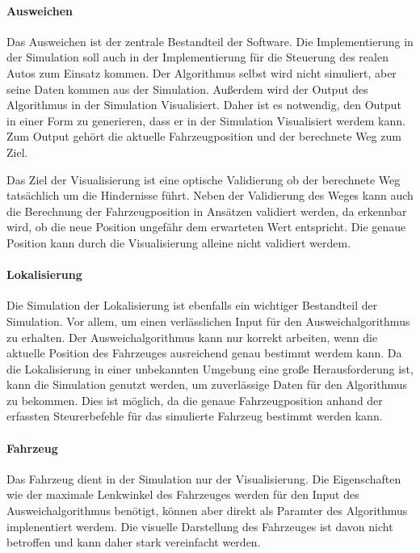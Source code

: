\paragraph{Ausweichen}
Das Ausweichen ist der zentrale Bestandteil der Software.
Die Implementierung in der Simulation soll auch in der Implementierung für die Steuerung des realen Autos zum Einsatz kommen.
Der Algorithmus selbst wird nicht simuliert, aber seine Daten kommen aus der Simulation. 
Außerdem wird der Output des Algorithmus in der Simulation Visualisiert. 
Daher ist es notwendig, den Output in einer Form zu generieren, dass er in der Simulation Visualisiert werdem kann.
Zum Output gehört die aktuelle Fahrzeugposition und der berechnete Weg zum Ziel.

Das Ziel der Visualisierung ist eine optische Validierung ob der berechnete Weg tatsächlich um die Hindernisse führt. 
Neben der Validierung des Weges kann auch die Berechnung der Fahrzeugposition in Ansätzen validiert werden, da erkennbar wird,
ob die neue Position ungefähr dem erwarteten Wert entspricht. Die genaue Position kann durch die Visualisierung alleine nicht validiert werdem.


\paragraph{Lokalisierung}
Die Simulation der Lokalisierung ist ebenfalls ein wichtiger Bestandteil der Simulation.
Vor allem, um einen verlässlichen Input für den Ausweichalgorithmus zu erhalten. 
Der Ausweichalgorithmus kann nur korrekt arbeiten, wenn die aktuelle Position des Fahrzeuges ausreichend genau bestimmt werdem kann.
Da die Lokalisierung in einer unbekannten Umgebung eine große Herausforderung ist, 
kann die Simulation genutzt werden, um zuverlässige Daten für den Algorithmus zu bekommen. 
Dies ist möglich, da die genaue Fahrzeugposition anhand der erfassten Steurerbefehle für das simulierte Fahrzeug bestimmt werden kann. 

\paragraph{Fahrzeug}
Das Fahrzeug dient in der Simulation nur der Visualisierung. 
Die Eigenschaften wie der maximale Lenkwinkel des Fahrzeuges werden für den Input des Ausweichalgorithmus benötigt, 
können aber direkt als Paramter des Algorithmus implenentiert werdem.
Die visuelle Darstellung des Fahrzeuges ist 
davon nicht betroffen und kann daher stark vereinfacht werden. 

